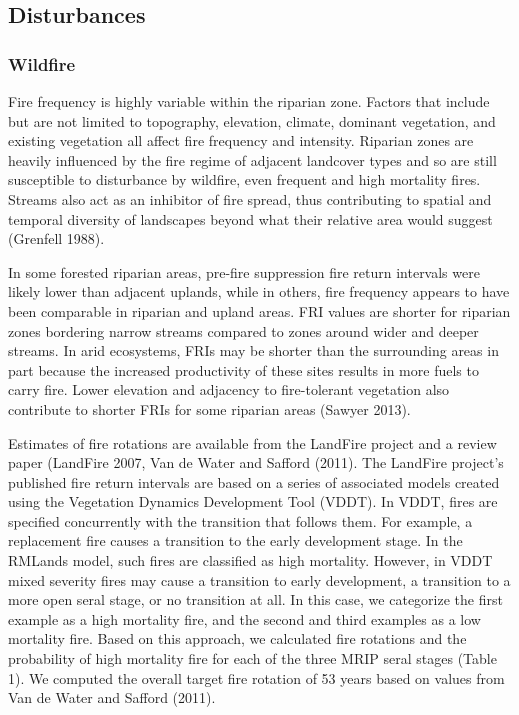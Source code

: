 \subsection*{Disturbances}

\subsubsection{Wildfire}
Fire frequency is highly variable within the riparian zone. Factors that include but are not limited to topography, elevation, climate, dominant vegetation, and existing vegetation all affect fire frequency and intensity. Riparian zones are heavily influenced by the fire regime of adjacent landcover types and so are still susceptible to disturbance by wildfire, even frequent and high mortality fires. Streams also act as an inhibitor of fire spread, thus contributing to spatial and temporal diversity of landscapes beyond what their relative area would suggest (Grenfell 1988). 

In some forested riparian areas, pre-fire suppression fire return intervals were likely lower than adjacent uplands, while in others, fire frequency appears to have been comparable in riparian and upland areas. FRI values are shorter for riparian zones bordering narrow streams compared to zones around wider and deeper streams. In arid ecosystems, FRIs may be shorter than the surrounding areas in part because the increased productivity of these sites results in more fuels to carry fire. Lower elevation and adjacency to fire-tolerant vegetation also contribute to shorter FRIs for some riparian areas (Sawyer 2013).

Estimates of fire rotations are available from the LandFire project and a review paper (LandFire 2007, Van de Water and Safford (2011). The LandFire project’s published fire return intervals are based on a series of associated models created using the Vegetation Dynamics Development Tool (VDDT). In VDDT, fires are specified concurrently with the transition that follows them. For example, a replacement fire causes a transition to the early development stage. In the RMLands model, such fires are classified as high mortality. However, in VDDT mixed severity fires may cause a transition to early development, a transition to a more open seral stage, or no transition at all. In this case, we categorize the first example as a high mortality fire, and the second and third examples as a low mortality fire. Based on this approach, we calculated fire rotations and the probability of high mortality fire for each of the three MRIP seral stages (Table 1). We computed the overall target fire rotation of 53 years based on values from Van de Water and Safford (2011). 




